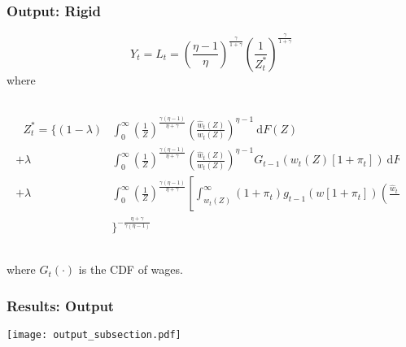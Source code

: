 \documentclass{beamer}
\begin{document}
\begin{frame}[t]\frametitle{Output: Rigid}
\fontsize{9pt}{12}\selectfont

    \begin{equation*}
        \label{eq:output_rigid}
        Y_t = L_t = \left(\frac{\eta - 1}{\eta} \right)^{\frac{\gamma}{1 + \gamma}}\left( \frac{1}{Z_t^*} \right)^{\frac{\gamma}{1 + \gamma}}
    \end{equation*}
    where

\begin{columns}
\begin{column}{0.1\textwidth}

    \begin{align*}
        \label{eq:z_star}
        \begin{split}
        \ \ \ Z_t^* = \Big\{(1 - \lambda) &\int_{0}^{\infty} \! \left( \frac{1}{Z} \right)^{\frac{\gamma(\eta - 1)}{\eta + \gamma}} \left( \frac{\hat{w}_t(Z)}{w_t(Z)} \right)^{\eta - 1}\ \mathup{d}F(Z) \\
              +            \lambda  &\int_{0}^{\infty} \! \left( \frac{1}{Z} \right)^{\frac{\gamma(\eta - 1)}{\eta + \gamma}} \left( \frac{\hat{w}_t(Z)}{w_t(Z)} \right)^{\eta - 1} G_{t-1}\left( w_t(Z)[1 + \pi_t] \right)                                                     \ \mathup{d}F(Z)\\
              +            \lambda  &\int_{0}^{\infty} \! \left( \frac{1}{Z} \right)^{\frac{\gamma(\eta - 1)}{\eta + \gamma}} \left[ \int_{w_t(Z)}^{\infty} (1 + \pi_t)g_{t-1}\left( w[1 + \pi_t] \right) \left( \frac{\hat{w}_t(Z)}{w} \right)^{\eta - 1}\ \mathup{d}w \right] \mathup{d}F(Z)  \\
              &\Big\}^{-\frac{\eta + \gamma}{\gamma(\eta - 1)}}
        \end{split}
    \end{align*}


\end{column}
\begin{column}{0.1\textwidth}
\end{column}
\end{columns}

    where $G_t(\cdot)$ is the CDF of wages.

\end{frame}

\begin{frame}[t]\frametitle{Results: Output}

    \begin{center}
      \texttt{[image: output\_subsection.pdf]}
      \label{fig:output}
    \end{center}



\end{frame}
\end{document}
